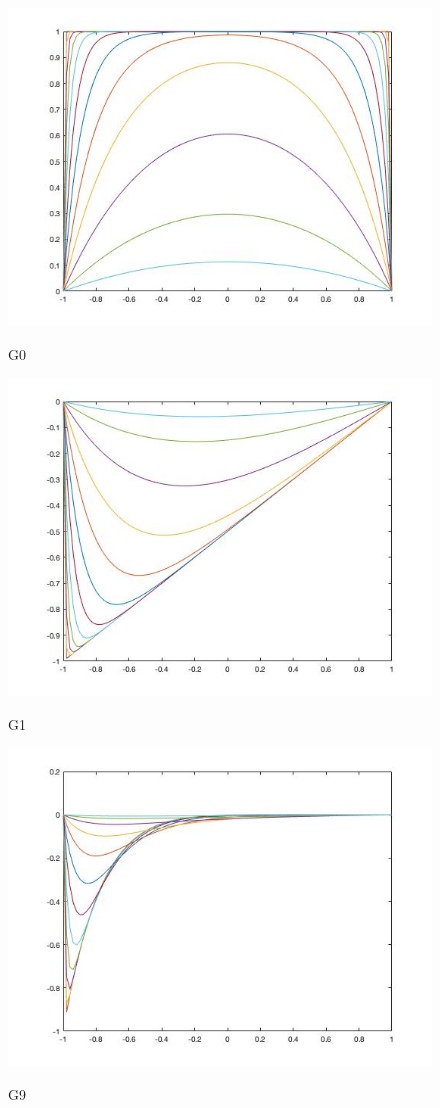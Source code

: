 \documentclass[11pt]{amsart}
\begin{document}
\begin{figure}[htbp]
\begin{center}
\includegraphics[scale=0.5]{Greens0.jpg}
\caption{G0}
\label{G0}
\includegraphics[scale=0.5]{Greens1.jpg}
\caption{G1}
\label{G1}
\includegraphics[scale=0.5]{Greens9.jpg}
\caption{G9}
\end{center}
\end{figure}
\end{document}
